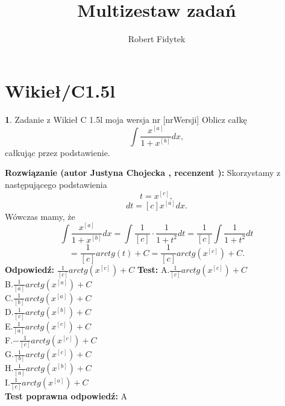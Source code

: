 \documentclass[12pt, a4paper]{article}
\title{Multizestaw zadań}
\author{Robert Fidytek}
\date{}
\theoremstyle{definition} %
\newtheorem{zad}{}
\newcommand{\kategoria}[1]{\section{#1}} %
\newcommand{\zadStart}[1]{\begin{zad}#1\newline} %
\newcommand{\zadStop}{\end{zad}}   %
\newcommand{\rozwStart}[2]{\noindent \textbf{Rozwiązanie (autor #1 , recenzent #2): }\newline} %
\newcommand{\rozwStop}{\newline}                                            %
\newcommand{\odpStart}{\noindent \textbf{Odpowiedź:}\newline}    %
\newcommand{\odpStop}{\newline}                                             %
\newcommand{\testStart}{\noindent \textbf{Test:}\newline} %
\newcommand{\testStop}{\newline} %
\newcommand{\kluczStart}{\noindent \textbf{Test poprawna odpowiedź:}\newline} %
\newcommand{\kluczStop}{\newline} %
\begin{document}
\maketitle
\kategoria{Wikieł/C1.5l}
\zadStart{Zadanie z Wikieł C 1.5l moja wersja nr [nrWersji]}
Oblicz całkę $$\int \frac{x^{[a]}}{1+x^{[b]}} dx,$$ całkując przez podstawienie.
\zadStop
\rozwStart{Justyna Chojecka}{}
Skorzystamy z następującego podstawienia
$$t=x^{[c]},$$
$$dt=[c]x^{[a]}dx.$$
Wówczas mamy, że
$$\int \frac{x^{[a]}}{1+x^{[b]}} dx=\int \frac{1}{[c]}\cdot \frac{1}{1+t^{2}}dt=\frac{1}{[c]}\int \frac{1}{1+t^{2}}dt$$$$=\frac{1}{[c]}arctg(t)+C=\frac{1}{[c]}arctg(x^{[c]})+C.$$
\rozwStop
\odpStart
$\frac{1}{[c]}arctg(x^{[c]})+C$
\odpStop
\testStart
A.$\frac{1}{[c]}arctg(x^{[c]})+C$\\
B.$\frac{1}{[a]}arctg(x^{[a]})+C$\\
C.$\frac{1}{[b]}arctg(x^{[a]})+C$\\
D.$\frac{1}{[c]}arctg(x^{[b]})+C$\\
E.$\frac{1}{[a]}arctg(x^{[c]})+C$\\
F.$-\frac{1}{[c]}arctg(x^{[c]})+C$\\
G.$\frac{1}{[b]}arctg(x^{[c]})+C$\\
H.$\frac{1}{[a]}arctg(x^{[b]})+C$\\
I.$\frac{1}{[c]}arctg(x^{[a]})+C$\\
\testStop
\kluczStart
A
\kluczStop
\end{document}
